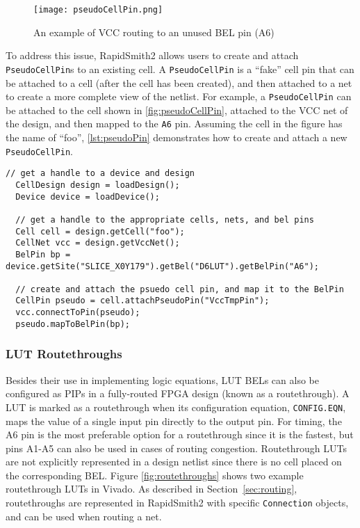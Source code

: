 \begin{figure}[h!]
  \centering
  \texttt{[image: pseudoCellPin.png]}
  \caption{An example of VCC routing to an unused BEL pin (A6)}
  \label{fig:pseudoCellPin}
\end{figure}

To address this issue, RapidSmith2 allows users to create and attach
\texttt{PseudoCellPin}s to an existing cell. A \texttt{PseudoCellPin} is a
``fake'' cell pin that can be attached to a cell (after the cell has been
created), and then attached to a net to create a more complete view of the 
netlist. For example, a \texttt{PseudoCellPin} can be attached to the cell shown
in \autoref{fig:pseudoCellPin}, attached to the VCC net of the design, and then
mapped to the \texttt{A6} pin. Assuming the cell in the figure has the name of
``foo'', \autoref{lst:pseudoPin} demonstrates how to create and attach a new
\texttt{PseudoCellPin}.

\begin{lstlisting}[xleftmargin=1.5em, framexleftmargin=1.5em, caption=Required
function calls to attach a PseudoPin to a Cell, label=lst:pseudoPin] 
  // get a handle to a device and design
  CellDesign design = loadDesign();
  Device device = loadDevice();
  
  // get a handle to the appropriate cells, nets, and bel pins
  Cell cell = design.getCell("foo");
  CellNet vcc = design.getVccNet();
  BelPin bp = device.getSite("SLICE_X0Y179").getBel("D6LUT").getBelPin("A6");
  
  // create and attach the psuedo cell pin, and map it to the BelPin
  CellPin pseudo = cell.attachPseudoPin("VccTmpPin");
  vcc.connectToPin(pseudo);
  pseudo.mapToBelPin(bp);
\end{lstlisting}

\subsubsection {LUT Routethroughs} \label{sec:belRoutethroughs}
Besides their use in implementing logic equations, LUT BELs can also be
configured as PIPs in a fully-routed FPGA design (known as a routethrough). A
LUT is marked as a routethrough when its configuration equation,
\texttt{CONFIG.EQN}, maps the value of a single input pin directly to the
output pin. For timing, the A6 pin is the most preferable option for
a routethrough since it is the fastest, but pins A1-A5 can also be
used in cases of routing congestion. Routethrough LUTs are not explicitly
represented in a design netlist since there is no cell placed on the
corresponding BEL. Figure \ref{fig:routethroughs} shows two example routethrough
LUTs in Vivado. As described in Section~\ref{sec:routing}, routethroughs are
represented in RapidSmith2 with specific \texttt{Connection} objects, and can be
used when routing a net.

